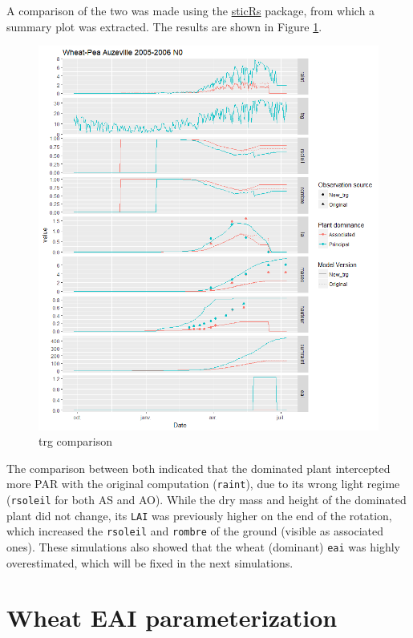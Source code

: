 \documentclass[]{book}
\begin{document}
A comparison of the two was made using the \href{https://github.com/VEZY/sticRs}{sticRs} package, from which a summary plot was extracted. The results are shown in Figure \ref{fig:trgcomparison1}.

\begin{figure}
\centering
\includegraphics{img/trg-computation.png}
\caption{\label{fig:trgcomparison1}trg comparison}
\end{figure}

The comparison between both indicated that the dominated plant intercepted more PAR with the original computation (\texttt{raint}), due to its wrong light regime (\texttt{rsoleil} for both AS and AO). While the dry mass and height of the dominated plant did not change, its \texttt{LAI} was previously higher on the end of the rotation, which increased the \texttt{rsoleil} and \texttt{rombre} of the ground (visible as associated ones).
These simulations also showed that the wheat (dominant) \texttt{eai} was highly overestimated, which will be fixed in the next simulations.

\hypertarget{eai}{%
\chapter{Wheat EAI parameterization}\label{eai}}
\end{document}
